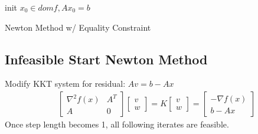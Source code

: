 \message{ !name(notebook.tex)}\documentclass[8pt]{report}
\begin{document}
\begin{multicols*}{2}
  \vfill\null
  \columnbreak
  
  \begin{algorithm}[H]
    init $x_0 \in dom f, Ax_0=b$\;
    \caption{Newton Method w/ Equality Constraint\label{NewtonMethodEq}}
  \end{algorithm}

  \subsection{Infeasible Start Newton Method}
  Modify KKT system for residual: $Av=b-Ax$
  \begin{align*}
    &\begin{bmatrix}
      \nabla^2 f(x) & A^T \\
      A & 0 
    \end{bmatrix}
          \begin{bmatrix}
            v\\ w
          \end{bmatrix}=
    K
    \begin{bmatrix}
      v\\ w
    \end{bmatrix} =
    \begin{bmatrix}
      -\nabla f(x)\\
      b-Ax
    \end{bmatrix}
  \end{align*}
  Once step length becomes 1, all following iterates are feasible.\\


\end{multicols*}
\end{document}
